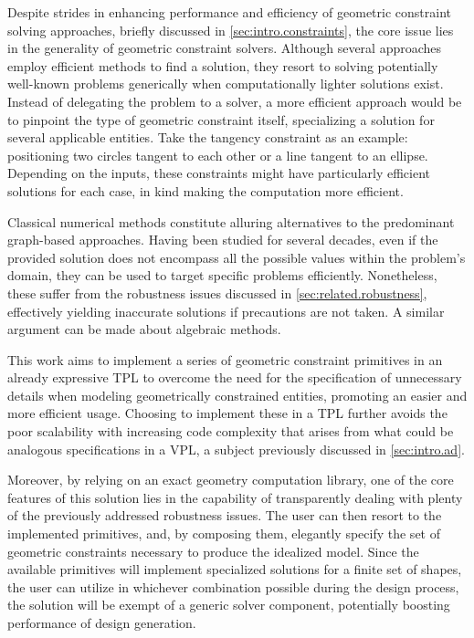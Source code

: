 %
\label{chap:solution}
\cleardoublepage{}

\noindent
Despite strides in enhancing performance and efficiency of geometric constraint
solving approaches, briefly discussed in \cref{sec:intro.constraints}, the core
issue lies in the generality of geometric constraint solvers.  Although several
approaches employ efficient methods to find a solution, they resort to solving
potentially well-known problems generically when computationally lighter
solutions exist.  Instead of delegating the problem to a solver, a more
efficient approach would be to pinpoint the type of geometric constraint itself,
specializing a solution for several applicable entities.  Take the tangency
constraint as an example: positioning two circles tangent to each other or a
line tangent to an ellipse.  Depending on the inputs, these constraints might
have particularly efficient solutions for each case, in kind making the
computation more efficient.

Classical numerical methods constitute alluring alternatives to the predominant
graph-based approaches.  Having been studied for several decades, even if the
provided solution does not encompass all the possible values within the
problem's domain, they can be used to target specific problems efficiently.
Nonetheless, these suffer from the robustness issues discussed in
\cref{sec:related.robustness}, effectively yielding inaccurate solutions if
precautions are not taken.  A similar argument can be made about algebraic
methods.

This work aims to implement a series of geometric constraint primitives in an
already expressive \ac{TPL} to overcome the need for the specification of
unnecessary details when modeling geometrically constrained entities, promoting
an easier and more efficient usage.  Choosing to implement these in a \ac{TPL}
further avoids the poor scalability with increasing code complexity that arises
from what could be analogous specifications in a \ac{VPL}, a subject previously
discussed in \cref{sec:intro.ad}.

Moreover, by relying on an exact geometry computation library, one of the core
features of this solution lies in the capability of transparently dealing with
plenty of the previously addressed robustness issues.  The user can then resort
to the implemented primitives, and, by composing them, elegantly specify the set
of geometric constraints necessary to produce the idealized model.  Since the
available primitives will implement specialized solutions for a finite set of
shapes, the user can utilize in whichever combination possible during the design
process, the solution will be exempt of a generic solver component, potentially
boosting performance of design generation.

